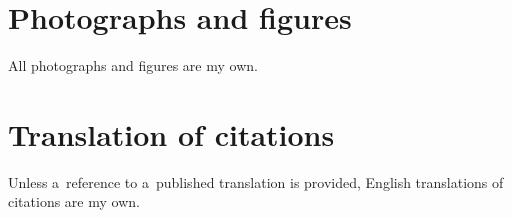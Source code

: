 
\section*{Photographs and figures}
\label{sec:images}

All photographs and figures are my own. 

\section*{Translation of citations}
\label{sec:translofcit}

Unless a~reference to a~published translation is provided, English translations of citations are my own. 

